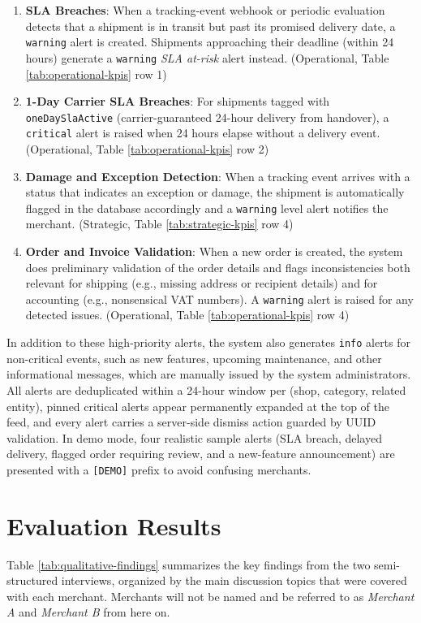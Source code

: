 \documentclass{imc-inf}
\begin{document}
\begin{enumerate}[left=0pt, itemsep=3pt]
  \item \textbf{SLA Breaches}: When a tracking-event webhook or periodic evaluation detects that a shipment is in transit but past its promised delivery date, a \texttt{warning} alert is created. Shipments approaching their deadline (within 24 hours) generate a \texttt{warning} \textit{SLA at-risk} alert instead. (Operational, Table \ref{tab:operational-kpis} row 1)
  \item \textbf{1-Day Carrier SLA Breaches}: For shipments tagged with \texttt{oneDaySlaActive} (carrier-guaranteed 24-hour delivery from handover), a \texttt{critical} alert is raised when 24 hours elapse without a delivery event. (Operational, Table \ref{tab:operational-kpis} row 2)
  \item \textbf{Damage and Exception Detection}: When a tracking event arrives with a status that indicates an exception or damage, the shipment is automatically flagged in the database accordingly and a \texttt{warning} level alert notifies the merchant. (Strategic, Table \ref{tab:strategic-kpis} row 4)
  \item \textbf{Order and Invoice Validation}: When a new order is created, the system does preliminary validation of the order details and flags inconsistencies both relevant for shipping (e.g., missing address or recipient details) and for accounting (e.g., nonsensical VAT numbers). A \texttt{warning} alert is raised for any detected issues. (Operational, Table \ref{tab:operational-kpis} row 4)
\end{enumerate}

In addition to these high-priority alerts, the system also generates \texttt{info} alerts for non-critical events, such as new features, upcoming maintenance, and other informational messages, which are manually issued by the system administrators.
All alerts are deduplicated within a 24-hour window per (shop, category, related entity), pinned critical alerts appear permanently expanded at the top of the feed, and every alert carries a server-side dismiss action guarded by UUID validation.
In demo mode, four realistic sample alerts (SLA breach, delayed delivery, flagged order requiring review, and a new-feature announcement) are presented with a \texttt{[DEMO]} prefix to avoid confusing merchants.

\section{Evaluation Results}
Table \ref{tab:qualitative-findings} summarizes the key findings from the two semi-structured interviews, organized by the main discussion topics that were covered with each merchant.
Merchants will not be named and be referred to as \textit{Merchant A} and \textit{Merchant B} from here on.
\end{document}
